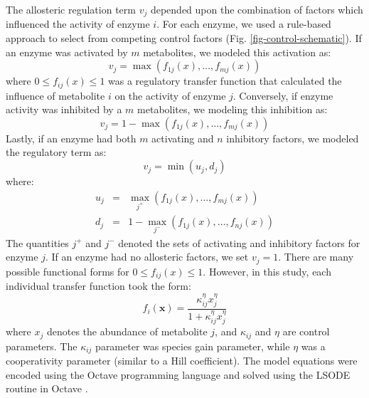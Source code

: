 \documentclass[12pt]{article}
\begin{document}
The allosteric regulation term $v_{j}$ depended upon the combination of factors which influenced the activity of enzyme $i$.
For each enzyme, we used a rule-based approach to select from competing control factors (Fig. \ref{fig-control-schematic}). 
If an enzyme was activated by $m$ metabolites, we modeled this activation as:
\begin{equation}
	v_{j} = \max\left(f_{1j}\left(x\right),\hdots,f_{mj}\left(x\right)\right)
\end{equation}where $0\leq f_{ij}\left(x\right)\leq 1$ was a regulatory transfer function that calculated the influence of metabolite $i$ on the activity of enzyme $j$. 
Conversely, if enzyme activity was inhibited by a $m$ metabolites, we modeling this inhibition as:
\begin{equation}
	v_{j} = 1 - \max\left(f_{1j}\left(x\right),\hdots,f_{mj}\left(x\right)\right)
\end{equation}Lastly, if an enzyme had both $m$ activating and $n$ inhibitory factors, we modeled the regulatory term as:
\begin{equation}
	v_{j} = \min\left(u_{j},d_{j}\right)
\end{equation}where:
\begin{eqnarray}
	u_{j} &=& \max_{j^{+}}\left(f_{1j}\left(x\right),\hdots,f_{mj}\left(x\right)\right) \\
	d_{j} &=& 1 - \max_{j^{-}}\left(f_{1j}\left(x\right),\hdots,f_{nj}\left(x\right)\right)
\end{eqnarray}
The quantities $j^{+}$ and $j^{-}$ denoted the sets of activating and inhibitory factors for enzyme $j$. 
If an enzyme had no allosteric factors, we set $v_{j} = 1$.
There are many possible functional forms for $0\leq f_{ij}\left(x\right)\leq 1$. 
However, in this study, each individual transfer function took the form:
\begin{equation}\label{eqn:control-factor}
	f_{i}\left(\mathbf{x}\right) = \frac{\kappa_{ij}^{\eta}x_{j}^{\eta}}{1 + \kappa_{ij}^{\eta}x_{j}^{\eta}}
\end{equation}where $x_{j}$ denotes the abundance of metabolite $j$, and $\kappa_{ij}$ and $\eta$ are control parameters. 
The $\kappa_{ij}$ parameter was species gain parameter, while $\eta$ was a cooperativity parameter (similar to a Hill coefficient).
The model equations were encoded using the Octave programming language and solved using the LSODE routine in Octave \citep{Octave:2014}.
\end{document}
